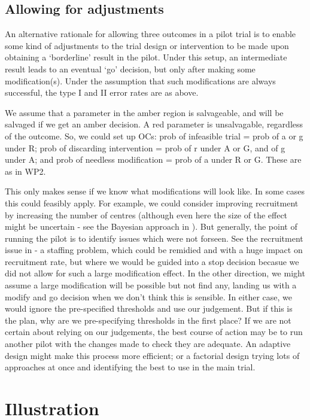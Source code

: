 \documentclass[sagev, Crown]{sagej} %
\begin{document}
\subsection{Allowing for adjustments}

An alternative rationale for allowing three outcomes in a pilot trial is to enable some kind of adjustments to the trial design or intervention to be made upon obtaining a `borderline' result in the pilot. Under this setup, an intermediate result leads to an eventual `go' decision, but only after making some modification(s). Under the assumption that such modifications are always successful, the type I and II error rates are as above. 

We assume that a parameter in the amber region is salvageable, and will be salvaged if we get an amber decision. A red parameter is unsalvagable, regardless of the outcome. So, we could set up OCs: prob of infeasible trial = prob of a or g under R; prob of discarding intervention = prob of r under A or G, and of g under A; and prob of needless modification = prob of a under R or G. These are as in WP2. 

This only makes sense if we know what modifications will look like. In some cases this could feasibly apply. For example, we could consider improving recruitment by increasing the number of centres (although even here the size of the effect might be uncertain - see the Bayesian approach in \cite{Hampson2017}). But generally, the point of running the pilot is to identify issues which were not forseen. See the recruitment issue in \cite{Avery2017} - a staffing problem, which could be remidied and with a huge impact on recruitment rate, but where we would be guided into a stop decision becasue we did not allow for such a large modification effect. In the other direction, we might assume a large modification will be possible but not find any, landing us with a modify and go decision when we don't think this is sensible. In either case, we would ignore the pre-specified thresholds and use our judgement. But if this is the plan, why are we pre-specifying thresholds in the first place? If we are not certain about relying on our judgements, the best course of action may be to run another pilot with the changes made to check they are adequate. An adaptive design might make this process more efficient; or a factorial design trying lots of approaches at once and identifying the best to use in the main trial.

\section{Illustration}
\end{document}
